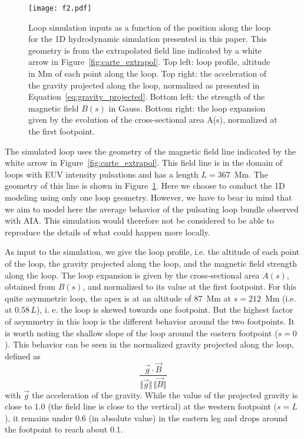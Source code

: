 \documentclass[preprint2]{aastex6}
\begin{document}

	\begin{figure}
		\centering
                 \texttt{[image: f2.pdf]}
                 \caption{Loop simulation inputs as a function of the position along the loop for the 1D hydrodynamic simulation presented in this paper. This geometry is from the extrapolated field line indicated by a white arrow in Figure~\ref{fig:carte_extrapol}. Top left: loop profile, altitude in Mm of each point along the loop. Top right: the acceleration of the gravity projected along the loop, normalized as presented in Equation~\ref{eq:gravity_projected}. Bottom left: the strength of the magnetic field $B(s)$ in Gauss. Bottom right: the loop expansion given by the evolution of the cross-sectional area A(s), normalized at the first footpoint.}
                 \label{fig:geometry_loop_simu}
	\end{figure}


\medskip

The simulated loop uses the geometry of the magnetic field line indicated by the white arrow in Figure~\ref{fig:carte_extrapol}. This field line is in the domain of loops with EUV intensity pulsations and has a length $L=367$~Mm. The geometry of this line is shown in Figure~\ref{fig:geometry_loop_simu}. 
Here we choose to conduct the 1D modeling using only one loop geometry. However, we have to bear in mind that we aim to model here the average behavior of the pulsating loop bundle observed with AIA. This simulation would therefore not be considered to be able to reproduce the details of what could happen more locally.

As input to the simulation, we give the loop profile, i.e. the altitude of each point of the loop, the gravity projected along the loop, and the magnetic field strength along the loop. The loop expansion is given by the cross-sectional area $A(s)$, obtained from $B(s)$, and normalized to its value at the first footpoint.
For this quite asymmetric loop, the apex is at an altitude of 87~Mm at $s=212$~Mm (i.e. at $0.58 \, L$), i. e. the loop is skewed towards one footpoint.
But the highest factor of asymmetry in this loop is the different behavior around the two footpoints. It is worth noting the shallow slope of the loop around the eastern footpoint ($s=0$). 
This behavior can be seen in the normalized gravity projected along the loop, defined as 
\begin{equation}
	\frac{\vec{g}\cdot\vec{B}}{\Vert\vec{g}\Vert \, \Vert\vec{B}\Vert}
	\label{eq:gravity_projected}
\end{equation}
with $\vec{g}$ the acceleration of the gravity.
While the value of the projected gravity is close to 1.0 (the field line is close to the vertical) at the western footpoint ($s=L$), it remains under 0.6 (in absolute value) in the eastern leg and drops around the footpoint to reach about 0.1. 
\end{document}
